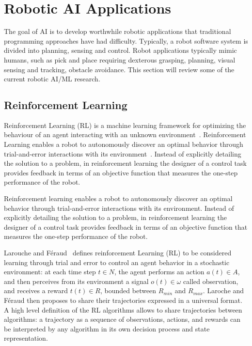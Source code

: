\section{Robotic AI Applications}
The goal of AI is to develop worthwhile robotic applications that traditional programming approaches have had difficulty. Typically, a robot software system is divided into planning, sensing and control. Robot applications typically mimic humans, such as pick and place requiring dexterous grasping, planning, visual sensing and tracking, obstacle avoidance.   This section will review some of the current robotic AI/ML research.

\subsection{Reinforcement Learning }
Reinforcement Learning (RL) is a machine learning framework for optimizing the behaviour of an agent interacting with an unknown environment~\cite{sutton1998introduction}.
Reinforcement Learning enables a robot to autonomously discover an optimal behavior through trial-and-error interactions
with its environment~\cite{kormushev2013reinforcement}. Instead of explicitly detailing the solution to a problem, in reinforcement learning the designer of a control task provides feedback in terms of an objective function that measures the one-step performance of the robot.

Reinforcement learning enables a robot to autonomously discover an optimal behavior through trial-and-error interactions
with its environment\cite{kormushev2013reinforcement}. Instead of explicitly detailing the solution to a problem, in reinforcement learning the designer of a control task provides feedback in terms of an objective function that measures the one-step performance of the robot.



Larouche and F\'{e}raud~\cite{laroche2017reinforcement} defines reinforcement Learning (RL) to be considered learning through trial and error to control an agent behavior in a stochastic environment: at each time step $t \in N$, the agent performs an action $a(t) \in  A $, and then perceives from its environment a signal $o(t) \in \omega$ called observation, and receives a reward $t(t) \in R$,  bounded between $R_{min}$ and $R_{max}$. Laroche and F\'{e}raud then proposes to share their trajectories expressed in a universal format. A high level definition of the RL algorithms allows to share trajectories between algorithms: a trajectory as a sequence of observations, actions, and rewards can be interpreted by any algorithm in its own decision process and state representation. 

